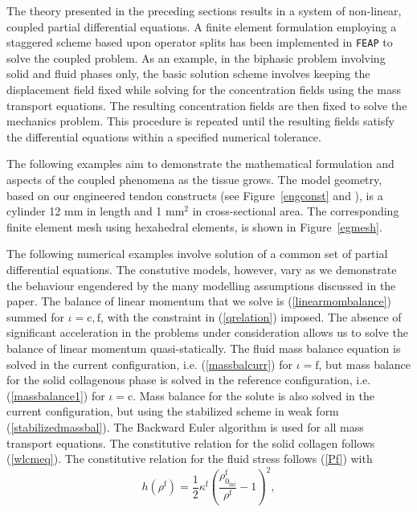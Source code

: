 The theory presented in the preceding sections results in a system of
non-linear, coupled partial differential equations. A finite element
formulation employing a staggered scheme based upon operator splits
\cite{Armero-poroplasticity:99,Garikipatiox2:01} has been implemented
in {\tt FEAP} \citep{feapmanual} to solve the coupled problem. As an
example, in the biphasic problem involving solid and fluid
phases only, the basic solution scheme involves keeping the displacement
field fixed while solving for the concentration fields using the mass
transport equations. The resulting concentration fields are then fixed
to solve the mechanics problem. This procedure is repeated until the
resulting fields satisfy the differential equations within a specified
numerical tolerance.

The following examples aim to demonstrate the mathematical formulation
and aspects of the coupled phenomena as the tissue grows. The model
geometry, based on our engineered tendon constructs (see
Figure~\ref{engconst} and \citet{Calve:04}), is a cylinder 12 mm in length and 1 mm$^2$ in
cross-sectional area. The corresponding finite element mesh using
hexahedral elements, is shown in Figure~\ref{egmesh}.

The following numerical examples involve solution of a common set of
partial differential equations. The constutive models, however, vary as we
demonstrate the behaviour engendered by the many modelling
assumptions discussed in the paper. The balance of linear momentum
that we solve is (\ref{linearmombalance}) summed for $\iota =
\mathrm{c,f}$, with the constraint in (\ref{qrelation}) imposed. The
absence of significant acceleration in the problems under 
consideration allows us to solve the balance of linear momentum   
quasi-statically. The fluid mass balance equation is solved in the current
configuration, i.e. (\ref{massbalcurr}) for $\iota = \mathrm{f}$, but 
mass balance for the solid collagenous phase is solved in the
reference configuration, i.e. (\ref{massbalance1}) for $\iota =
\mathrm{c}$.  Mass balance for the solute is also solved in the
current configuration, but using the stabilized scheme in weak
form (\ref{stabilizedmassbal}). The Backward 
Euler algorithm is used for all mass transport equations. The
constitutive relation for the solid collagen follows
(\ref{wlcmeq}). The constitutive relation for the fluid stress follows
(\ref{Pf}) with 
\begin{equation}
h(\rho^\mathrm{f}) =
\frac{1}{2}\kappa^\mathrm{f}\left(\frac{\rho_{0_\mathrm{ini}}^\mathrm{f}}{\rho^\mathrm{f}}
- 1\right)^2,
\end{equation}

